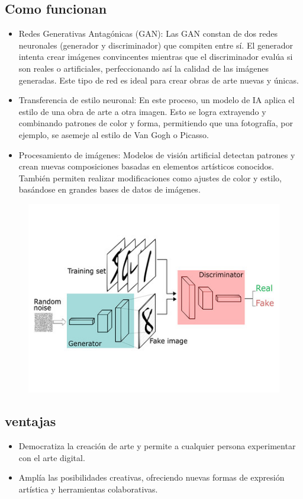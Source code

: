 \documentclass[12pt]{article}
\begin{document}
\subsection{Como funcionan}
\begin{itemize}
    \item Redes Generativas Antagónicas (GAN): 
    Las GAN constan de dos redes neuronales (generador y discriminador) que compiten entre sí. El generador intenta crear imágenes 
    convincentes mientras que el discriminador evalúa si son reales o artificiales, perfeccionando así la calidad de las imágenes generadas. 
    Este tipo de red es ideal para crear obras de arte nuevas y únicas.
    \item Transferencia de estilo neuronal: 
    En este proceso, un modelo de IA aplica el estilo de una obra de arte a otra imagen. 
    Esto se logra extrayendo y combinando patrones de color y forma, permitiendo que una fotografía, 
    por ejemplo, se asemeje al estilo de Van Gogh o Picasso.
    \item Procesamiento de imágenes:
    Modelos de visión artificial detectan patrones y crean nuevas composiciones basadas en elementos artísticos conocidos. 
    También permiten realizar modificaciones como ajustes de color y estilo, basándose en grandes bases de datos de imágenes.
\end{itemize}

\begin{figure}[h!]
    \centering
    \includegraphics[width=.6\textwidth]{GAN.jpg}
    \label{fig:my_label}
\end{figure}

\subsection{ventajas}
\begin{itemize}
    \item Democratiza la creación de arte y permite a cualquier persona experimentar con el arte digital.
    \item Amplía las posibilidades creativas, ofreciendo nuevas formas de expresión artística y herramientas colaborativas.
\end{itemize}
\end{document}
